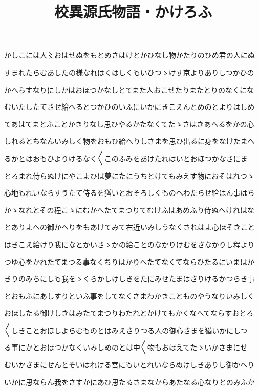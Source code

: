 \documentclass[a4paper,11pt,landscape]{ltjtarticle}
\title{校異源氏物語・かけろふ}
\date{}
\begin{document}
\maketitle

かしこには人〻おはせぬをもとめさはけとかひなし物かたりのひめ君の人にぬ
\par\medskip
すまれたらむあしたの様なれはくはしくもいひつゝけす京よりありしつかひの
\par\medskip
かへらすなりにしかはおほつかなしとてまた人おこせたりまたとりのなくにな
\par\medskip
むいたしたてさせ給へるとつかひのいふにいかにきこえんとめのとよりはしめ
\par\medskip
てあはてまとふことかきりなし思ひやるかたなくてたゝさはきあへるをかの心
\par\medskip
しれるとちなんいみしく物をおもひ給へりしさまを思ひ出るに身をなけたまへ
\par\medskip
るかとはおもひよりけるなく〱このふみをあけたれはいとおほつかなさにま
\par\medskip
とろまれ侍らぬけにやこよひは夢にたにうちとけてもみえす物におそはれつゝ
\par\medskip
心地もれいならすうたて侍るを猶いとおそろしくものへわたらせ給はん事はち
\par\medskip
かゝなれとその程こゝにむかへたてまつりてむけふはあめふり侍ぬへけれはな
\par\medskip
とありよへの御かへりをもあけてみて右近いみしうなくされはよ心ほそきこと
\par\medskip
はきこえ給けり我になとかいさゝかの給ことのなかりけむをさなかりし程より
\par\medskip
つゆ心をかれたてまつる事なくちりはかりへたてなくてならひたるにいまはか
\par\medskip
きりのみちにしも我をゝくらかしけしきをたにみせたまはさりけるかつらき事
\par\medskip
とおもふにあしすりといふ事をしてなくさまわかきことものやうなりいみしく
\par\medskip
おほしたる御けしきはみたてまつりわたれとかけてもかくなへてならすおとろ
\par\medskip
〱しきことおほしよらむものとはみえさりつる人の御心さまを猶いかにしつ
\par\medskip
る事にかとおほつかなくいみしめのとは中〱物もおほえてたゝいかさまにせ
\par\medskip
むいかさまにせんとそいはれける宮にもいとれいならぬけしきありし御かへり
\par\medskip
いかに思ならん我をさすかにあひ思たるさまなからあたなる心なりとのみふか
\end{document}
